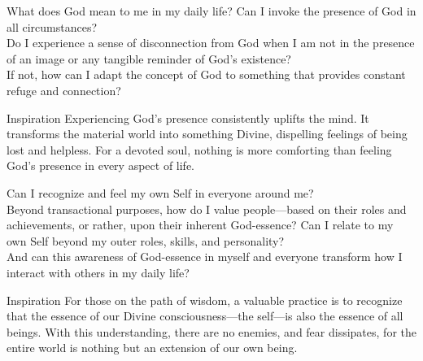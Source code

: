 \newpage
\begin{mananam}{}
\mananamtext What does God mean to me in my daily life? Can I invoke the presence of God in all circumstances?\\
Do I experience a sense of disconnection from God when I am not in the presence of an image or any tangible reminder of God’s existence?\\
If not, how can I adapt the concept of God to something that provides constant refuge and connection?
\end{mananam}
\WritingHand{}
\begin{inspiration}{\mananamfont Inspiration}
\mananamtext Experiencing God’s presence consistently uplifts the mind. It transforms the material world into something Divine, dispelling feelings of being lost and helpless. For a devoted soul, nothing is more comforting than feeling God’s presence in every aspect of life.
\end{inspiration}
\newpage

\newpage
\begin{mananam}{}
\mananamtext Can I recognize and feel my own Self in everyone around me?\\
Beyond transactional purposes, how do I value people—based on their roles and achievements, or rather, upon their inherent God-essence?
Can I relate to my own Self beyond my outer roles, skills, and personality?\\
And can this awareness of God-essence in myself and everyone transform how I interact with others in my daily life?
\end{mananam}
\WritingHand{}
\begin{inspiration}{\mananamfont Inspiration}
\mananamtext For those on the path of wisdom, a valuable practice is to recognize that the essence of our Divine consciousness—the self—is also the essence of all beings. With this understanding, there are no enemies, and fear dissipates, for the entire world is nothing but an extension of our own being.
\end{inspiration}
\newpage

